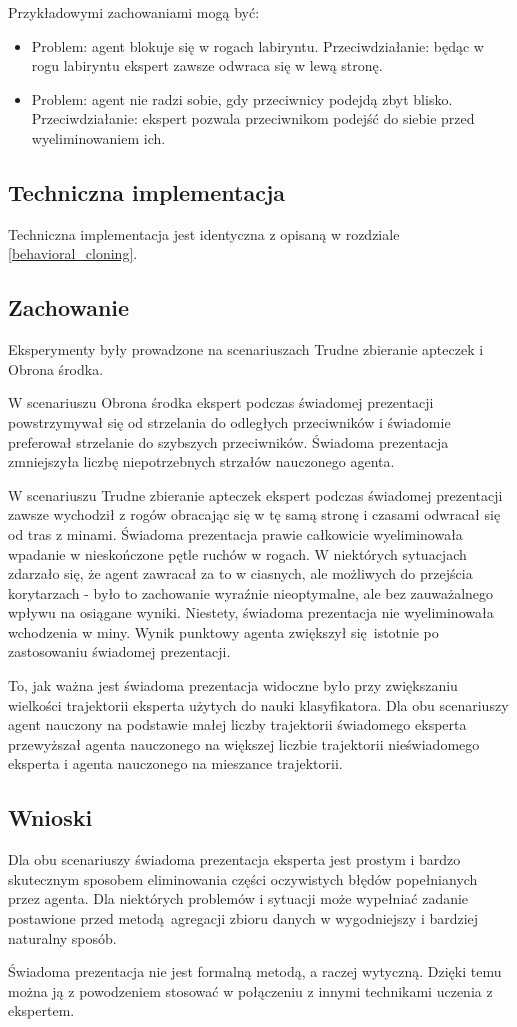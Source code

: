 \pagebreak
Przykładowymi zachowaniami mogą być:
\begin{itemize}
\item{Problem: agent blokuje się w rogach labiryntu. Przeciwdziałanie: będąc w rogu labiryntu ekspert zawsze odwraca się w lewą stronę.}
\item{Problem: agent nie radzi sobie, gdy przeciwnicy podejdą zbyt blisko. Przeciwdziałanie: ekspert pozwala przeciwnikom podejść do siebie przed wyeliminowaniem ich.}
\end{itemize}

\subsection{Techniczna implementacja}

Techniczna implementacja jest identyczna z opisaną w rozdziale \ref{behavioral_cloning}.

\subsection{Zachowanie}
Eksperymenty były prowadzone na scenariuszach Trudne zbieranie apteczek i Obrona środka.

W scenariuszu Obrona środka ekspert podczas świadomej prezentacji powstrzymywał się od strzelania do odległych przeciwników i świadomie preferował strzelanie do szybszych przeciwników. Świadoma prezentacja zmniejszyła liczbę niepotrzebnych strzałów nauczonego agenta.

W scenariuszu Trudne zbieranie apteczek ekspert podczas świadomej prezentacji zawsze wychodził z rogów obracając się w tę samą stronę i czasami odwracał się od tras z minami. Świadoma prezentacja prawie całkowicie wyeliminowała wpadanie w nieskończone pętle ruchów w rogach. W niektórych sytuacjach zdarzało się, że agent zawracał za to w ciasnych, ale możliwych do przejścia korytarzach - było to zachowanie wyraźnie nieoptymalne, ale bez zauważalnego wpływu na osiągane wyniki. Niestety, świadoma prezentacja nie wyeliminowała wchodzenia w miny. Wynik punktowy agenta zwiększył się istotnie po zastosowaniu świadomej prezentacji.

To, jak ważna jest świadoma prezentacja widoczne było przy zwiększaniu wielkości trajektorii eksperta użytych do nauki klasyfikatora. Dla obu scenariuszy agent nauczony na podstawie małej liczby trajektorii świadomego eksperta przewyższał agenta nauczonego na większej liczbie trajektorii nieświadomego eksperta i agenta nauczonego na mieszance trajektorii. 
 
\subsection{Wnioski}

Dla obu scenariuszy świadoma prezentacja eksperta jest prostym i bardzo skutecznym sposobem eliminowania części oczywistych błędów popełnianych przez agenta. Dla niektórych problemów i sytuacji może wypełniać zadanie postawione przed metodą agregacji zbioru danych w wygodniejszy i bardziej naturalny sposób.

Świadoma prezentacja nie jest formalną metodą, a raczej wytyczną. Dzięki temu można ją z powodzeniem stosować w połączeniu z innymi technikami uczenia z ekspertem.
